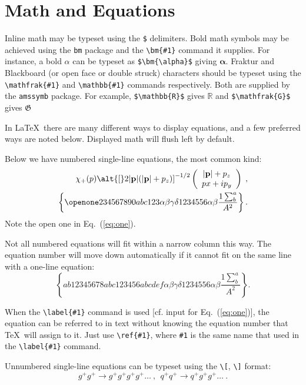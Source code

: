 \documentclass[%
 aapm,
 mph,%
 amsmath,amssymb,
 reprint,%
]{revtex4-2}
\begin{document}
\section{Math and Equations}
Inline math may be typeset using the \verb+$+ delimiters. Bold math
symbols may be achieved using the \verb+bm+ package and the
\verb+\bm{#1}+ command it supplies. For instance, a bold $\alpha$ can
be typeset as \verb+$\bm{\alpha}$+ giving $\bm{\alpha}$. Fraktur and
Blackboard (or open face or double struck) characters should be
typeset using the \verb+\mathfrak{#1}+ and \verb+\mathbb{#1}+ commands
respectively. Both are supplied by the \texttt{amssymb} package. For
example, \verb+$\mathbb{R}$+ gives $\mathbb{R}$ and
\verb+$\mathfrak{G}$+ gives $\mathfrak{G}$

In \LaTeX\ there are many different ways to display equations, and a
few preferred ways are noted below. Displayed math will flush left by
default.

Below we have numbered single-line equations, the most common kind: 
\begin{eqnarray}
\chi_+(p)\alt{\bf [}2|{\bf p}|(|{\bf p}|+p_z){\bf ]}^{-1/2}
\left(
\begin{array}{c}
|{\bf p}|+p_z\\
px+ip_y
\end{array}\right)\;,
\\
\left\{%
 \openone234567890abc123\alpha\beta\gamma\delta1234556\alpha\beta
 \frac{1\sum^{a}_{b}}{A^2}%
\right\}%
\label{eq:one}.
\end{eqnarray}
Note the open one in Eq.~(\ref{eq:one}).

Not all numbered equations will fit within a narrow column this
way. The equation number will move down automatically if it cannot fit
on the same line with a one-line equation:
\begin{equation}
\left\{
 ab12345678abc123456abcdef\alpha\beta\gamma\delta1234556\alpha\beta
 \frac{1\sum^{a}_{b}}{A^2}%
\right\}.
\end{equation}

When the \verb+\label{#1}+ command is used [cf. input for
Eq.~(\ref{eq:one})], the equation can be referred to in text without
knowing the equation number that \TeX\ will assign to it. Just
use \verb+\ref{#1}+, where \verb+#1+ is the same name that used in
the \verb+\label{#1}+ command.

Unnumbered single-line equations can be typeset
using the \verb+\[+, \verb+\]+ format:
\[g^+g^+ \rightarrow g^+g^+g^+g^+ \dots ~,~~q^+q^+\rightarrow
q^+g^+g^+ \dots ~. \]
\end{document}
